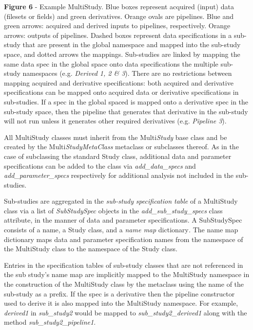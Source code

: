 
\textbf{Figure 6} - Example MultiStudy. Blue boxes represent acquired
(input) data (filesets or fields) and green derivatives. Orange ovals
are pipelines. Blue and green arrows: acquired and derived inputs to
pipelines, respectively. Orange arrows: outputs of pipelines. Dashed
boxes represent data specifications in a sub-study that are present in
the global namespace and mapped into the sub-study space, and dotted
arrows the mappings. Sub-studies are linked by mapping the same data
spec in the global space onto data specifications the multiple sub-study
namespaces (e.g. \emph{Derived 1, 2 \& 3}). There are no restrictions
between mapping acquired and derivative specifications: both acquired
and derivative specifications can be mapped onto acquired data or
derivative specifications in sub-studies. If a spec in the global spaced
is mapped onto a derivative spec in the sub-study space, then the
pipeline that generates that derivative in the sub-study will not run
unless it generates other required derivatives (e.g. \emph{Pipeline 3}).

All MultiStudy classes must inherit from the Multi\emph{Study} base
class and be created by the Multi\emph{StudyMetaClass} metaclass or
subclasses thereof. As in the case of subclassing the standard Study
class, additional data and parameter specifications can be added to the
class via \emph{add\_data\_specs} and \emph{add\_parameter\_specs}
respectively for additional analysis not included in the sub-studies.

Sub-studies are aggregated in the \emph{sub-study} \emph{specification
table} of a MultiStudy class via a list of \emph{SubStudySpec} objects
in the \emph{add\_sub\_study\_specs} class attribute, in the manner of
data and parameter specifications. A SubStudySpec consists of a name, a
Study class, and a \emph{name map} dictionary\emph{.} The name map
dictionary maps data and parameter specification names from the
namespace of the MultiStudy class to the namespace of the Study class.

Entries in the specification tables of sub-study classes that are not
referenced in the sub study's name map are implicitly mapped to the
MultiStudy namespace in the construction of the MultiStudy class by the
metaclass using the name of the sub-study as a prefix. If the spec is a
derivative then the pipeline constructor used to derive it is also
mapped into the MultiStudy namespace. For example, \emph{derived1} in
\emph{sub\_study2} would be mapped to \emph{sub\_study2\_derived1} along
with the method \emph{sub\_study2\_pipeline1}.

